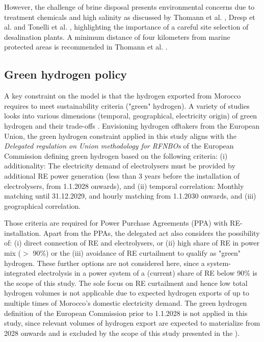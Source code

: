 \documentclass[5p,numafflabel]{elsarticle}
\begin{document}
However, the challenge of brine disposal presents environmental concerns due to treatment chemicals and high salinity as discussed by Thomann et al. \cite{Thomann2022}, Dresp et al. \cite{Dresp2019} and Tonelli et al. \cite{Tonelli2023}, highlighting the importance of a careful site selection of desalination plants. A minimum distance of four kilometers from marine protected areas is recommended in Thomann et al. \cite{Thomann2022}.



\subsection*{Green hydrogen policy}
\label{subsec:green_hydrogen_constraint}


A key constraint on the model is that the hydrogen exported from Morocco requires to meet sustainability criteria ("green" hydrogen). A variety of studies looks into various dimensions (temporal, geographical, electricity origin) of green hydrogen and their trade-offs \cite{Brauer2022, Ruhnau2022, Zeyen2024}.
Envisioning hydrogen offtakers from the European Union, the green hydrogen constraint applied in this study aligns with the \emph{Delegated regulation on Union methodology for RFNBOs} of the European Commission \cite{Commission2023} defining green hydrogen based on the following criteria:
(i) additionality: The electricity demand of electrolysers must be provided by additional RE power generation (less than 3 years before the installation of electrolysers, from 1.1.2028 onwards), and
(ii) temporal correlation: Monthly matching until 31.12.2029, and hourly matching from 1.1.2030 onwards, and
(iii) geographical correlation.

Those criteria are required for Power Purchase Agreements (PPA) with RE-installation. Apart from the PPAs, the delegated act also considers the possibility of:
(i) direct connection of RE and electrolysers, or
(ii) high share of RE in power mix ($>$ 90\%) or the
(iii) avoidance of RE curtailment
to qualify as "green" hydrogen. These further options are not considered here, since a system-integrated electrolysis in a power system of a (current) share of RE below 90\% is the scope of this study. The sole focus on RE curtailment and hence low total hydrogen volumes is not applicable due to expected hydrogen exports of up to multiple times of Morocco's domestic electricity demand. The green hydrogen definition of the European Commission prior to 1.1.2028 is not applied in this study, since relevant volumes of hydrogen export are expected to materialize from 2028 onwards and is excluded by the scope of this study presented in the ).
\end{document}
